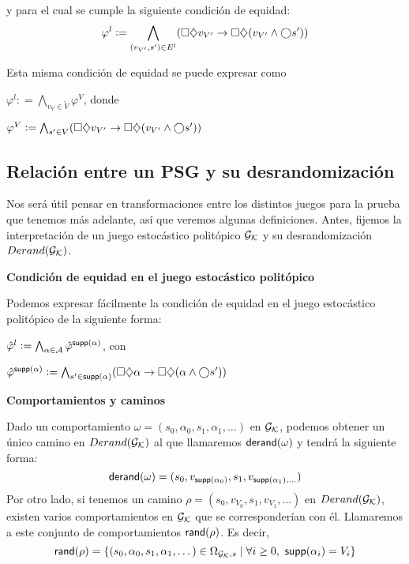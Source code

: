 y para el cual se cumple la siguiente condición de equidad: $$ \varphi^l :=
	\bigwedge_{(v_{V'},s') \in E^l} (\square \diamondsuit v_{V'} \rightarrow \square \diamondsuit
	(v_{V'} \wedge \bigcirc s' )) $$

Esta misma condición de equidad se puede expresar como

\begin{center}
	$ \varphi^l : = \bigwedge_{v_V \in \tilde V} \varphi^V $, donde

	$ \varphi^V := \bigwedge_{s' \in V} (\square \diamondsuit v_{V'} \rightarrow \square \diamondsuit (v_{V'} \wedge \bigcirc s' ))$
\end{center}

\subsection{Relación entre un PSG y su desrandomización}

Nos será útil pensar en transformaciones entre los distintos juegos para la
prueba que tenemos más adelante, así que veremos algunas definiciones. Antes,
fijemos la interpretación de un juego estocástico politópico $\mathcal{G}_{\mathcal{K}}$ y su
desrandomización $Derand(\mathcal{G}_{\mathcal{K}})$.

\textbf{Condición de equidad en el juego estocástico politópico}

Podemos expresar fácilmente la condición de equidad en el juego estocástico
politópico de la siguiente forma:

\begin{center}
	$
		\hat \varphi^l := \bigwedge_{\alpha \in \mathcal{A}} \hat \varphi^{\textsf{supp}(\alpha)}
	$, con

	$
		\hat \varphi^{\textsf{supp}(\alpha)} := \bigwedge_{s' \in \textsf{supp}(\alpha)} (\square \diamondsuit \alpha \rightarrow \square \diamondsuit (\alpha \wedge \bigcirc s' ))
	$
\end{center}

\textbf{Comportamientos y caminos}

Dado un comportamiento $\omega = (s_0, \alpha_0, s_1, \alpha_1, \dots)$ en
$\mathcal{G}_{\mathcal{K}}$, podemos obtener un único camino en $Derand(\mathcal{G}_{\mathcal{K}})$ al que llamaremos
$\textsf{derand}(\omega)$ y tendrá la siguiente forma: $$\textsf{derand}(\omega) = (s_0,
	v_{\textsf{supp}(\alpha_0)}, s_1, v_{\textsf{supp}(\alpha_1), \dots})$$ Por otro lado, si
tenemos un camino $\rho = (s_0, v_{V_0}, s_1, v_{V_1}, \dots)$ en $Derand(\mathcal{G}_{\mathcal{K}})$,
existen varios comportamientos en $\mathcal{G}_{\mathcal{K}}$ que se corresponderían con él.
Llamaremos a este conjunto de comportamientos $\textsf{rand}(\rho)$. Es decir,
$$\textsf{rand}(\rho) = \{(s_0, \alpha_0, s_1, \alpha_1, \dots) \in \Omega_{\mathcal{G}_{\mathcal{K}},s} \mid
	\forall i \geq 0, \ \textsf{supp}(\alpha_i) = V_i\}$$

